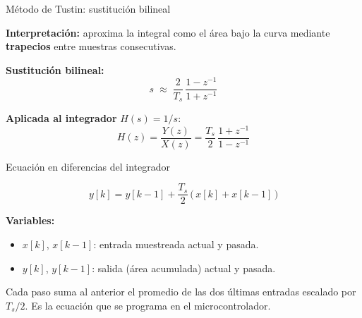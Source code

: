 \documentclass[aspectratio=169,t]{beamer}
\begin{document}
\begin{frame}{Método de Tustin: sustitución bilineal}
\vspace{3mm}

\textbf{Interpretación:} aproxima la integral como el área bajo la curva mediante \textbf{trapecios} entre muestras consecutivas.

\textbf{Sustitución bilineal:}
\begin{equation*}
s \;\approx\; \frac{2}{T_s}\,\frac{1 - z^{-1}}{1 + z^{-1}}
\end{equation*}

\textbf{Aplicada al integrador} $H(s) = 1/s$:
\begin{equation*}
H(z) = \frac{Y(z)}{X(z)} = \frac{T_s}{2}\,\frac{1 + z^{-1}}{1 - z^{-1}}
\end{equation*}
\end{frame}

\begin{frame}{Ecuación en diferencias del integrador}
\vspace{10mm}

\begin{equation*}
\boxed{\;
y[k] = y[k-1] + \frac{T_s}{2}\,\big(\,x[k] + x[k-1]\,\big)
\;}
\end{equation*}

\vspace{6mm}
\textbf{Variables:}
\begin{itemize}
\item $x[k]$, $x[k-1]$: entrada muestreada actual y pasada.
\item $y[k]$, $y[k-1]$: salida (área acumulada) actual y pasada.
\end{itemize}

\vspace{4mm}
{\small Cada paso suma al anterior el promedio de las dos últimas entradas escalado por $T_s/2$. Es la ecuación que se programa en el microcontrolador.}
\end{frame}
\end{document}
